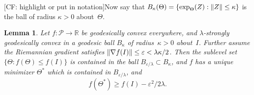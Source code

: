 \documentclass{article}
\newtheorem{lemma}[theorem]{Lemma}
\DeclarePairedDelimiter{\norm}{\lVert}{\rVert}
\newcommand{\R}{{\mathbb{R}}}
\newcommand\eps{\varepsilon}
\newcommand\SPD{\mathcal{P}}
\newcommand{\CF}[1]{{\color{purple}[CF: #1]}}
\newcommand{\RMO}[1]{{\color{red}[RMO: #1]}}
\begin{document}
\noindent
\CF{highlight or put in notation}Now say that $B_\kappa(\Theta) = \{ \exp_{\Theta}(Z) : \norm Z \leq \kappa \}$ is the ball of radius $\kappa>0$ about~$\Theta$.

\begin{lemma}\label{lem:convex-ball}
Let $f\colon \SPD\to \R$ be geodesically convex everywhere, and $\lambda$-strongly geodesically convex in a geodesic ball $B_\kappa$ of radius~$\kappa>0$ about~$I$.
Further assume the Riemannian gradient satisfies $\norm{\nabla f(I)} \leq \eps < \lambda \kappa / 2$.
Then the sublevel set $\{\Theta:f(\Theta) \leq f(I)\}$ is contained in the ball $B_{\eps/\lambda} \subset B_\kappa$, and $f$ has a unique minimizer $\Theta^*$ which is contained in $B_{\eps/\lambda}$, and 
$$ f(\Theta^*) \geq f(I) - \eps^2/2 \lambda.$$
\end{lemma}

\end{document}
